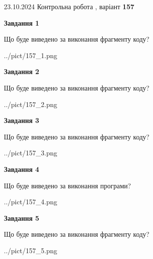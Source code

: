 \documentclass[12pt, ukrainian]{article}
\begin{document}
{\Large{23.10.2024 Контрольна робота , варіант  \No \textbf { 157 }\par}}
{
\begin {large}
{\begin {center}\textbf{Завдання 1}\end {center}}

Що буде виведено за виконання фрагменту коду?\par
\begin{center}
	{../pict/157_1.png}
\end{center}
\newpage

{\begin {center}\textbf{Завдання 2}\end {center}}

Що буде виведено за виконання фрагменту коду?\par
\begin{center}
	{../pict/157_2.png}
\end{center}
\newpage

{\begin {center}\textbf{Завдання 3}\end {center}}

Що буде виведено за виконання фрагменту коду?\par
\begin{center}
	{../pict/157_3.png}
\end{center}
\newpage

{\begin {center}\textbf{Завдання 4}\end {center}}

Що буде виведено за виконання програми?\par
\begin{center}
	{../pict/157_4.png}
\end{center}
\newpage

{\begin {center}\textbf{Завдання 5}\end {center}}

Що буде виведено за виконання фрагменту коду?\par
\begin{center}
	{../pict/157_5.png}
\end{center}
\newpage


\end{large}}
\end{document}
